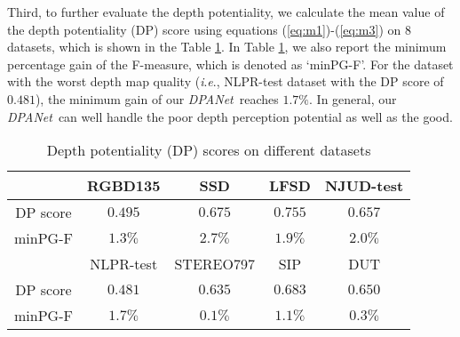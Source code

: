 \documentclass[journal]{IEEEtran}
\def\OURNET{\textit{DPANet}}
\newcommand{\ie}{\textit{i}.\textit{e}.}
\begin{document}
Third, to further evaluate the depth potentiality, we calculate the mean value of the depth potentiality (DP) score using equations (\ref{eq:m1})-(\ref{eq:m3}) on $8$ datasets, which is shown in the Table \ref{tab:dp}. In Table \ref{tab:dp}, we also report the minimum percentage gain of the F-measure, which is denoted as `minPG-F'. For the dataset with the worst depth map quality (\ie, NLPR-test dataset with the DP score of $0.481$), the minimum gain of our \OURNET\ reaches $1.7\%$. In general, our \OURNET\ can well handle the poor depth perception potential as well as the good.





\begin{table}[!t]
    \centering
    \normalsize
    \caption{Depth potentiality (DP) scores on different datasets}
    \setlength{\tabcolsep}{1.2mm}
{
    \begin{tabular}{|c|c|c|c|c|}
        \hline
         &  RGBD135 & SSD & LFSD & NJUD-test \\
         \hline
         DP score & $0.495$ & $0.675$ & $0.755$ & $0.657$ \\
         \hline
         minPG-F & $1.3 \%$ & $2.7\%$ & $1.9\%$ & $2.0\%$ \\
         \hline
         & NLPR-test & STEREO797 & SIP & DUT\\
         \hline
         DP score & $0.481$ & $0.635$ & $0.683$ & $0.650$ \\
         \hline
         minPG-F & $1.7\%$ & $0.1\%$ & $1.1\%$ & $0.3\%$ \\
         \hline
    \end{tabular}}
    \label{tab:dp}
\end{table}
\end{document}
